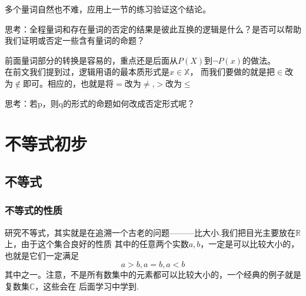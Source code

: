 多个量词自然也不难，应用上一节的练习验证这个结论。

思考：全程量词和存在量词的否定的结果是彼此互换的逻辑是什么？是否可以帮助我们证明或否定一些含有量词的命题？

前面量词部分的转换是容易的，重点还是后面从$P(X)$到$\neg P(x)$的做法。
\\在前文我们提到过，逻辑用语的最本质形式是$x \in \mathbb{X} $，
而我们要做的就是把$\in$改为$\notin$即可。相应的，也就是将$=$改为$\neq$,$>$改为$\leq$

思考：若p，则q的形式的命题如何改成否定形式呢？

\clearpage
\chapter{不等式初步}
\section{不等式}
\subsection{不等式的性质}
研究不等式，其实就是在追溯一个古老的问题———比大小.我们把目光主要放在$\mathbb{R}$上，由于这个集合良好的性质
其中的任意两个实数$a,b$，一定是可以比较大小的，也就是它们一定满足
\[a>b,a=b,a<b\]
其中之一。注意，不是所有数集中的元素都可以比较大小的，一个经典的例子就是复数集$\mathbb{C}$，这些会在
后面学习中学到.

